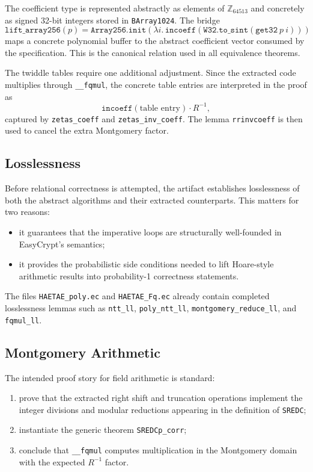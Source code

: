 \documentclass[11pt]{article}
\newcommand{\file}[1]{\texttt{#1}}
\newcommand{\ec}[1]{\texttt{#1}}
\begin{document}
The coefficient type is represented abstractly as elements of
$\mathbb{Z}_{64513}$ and concretely as signed 32-bit integers stored in
\ec{BArray1024}. The bridge
\[
\ec{lift\_array256}(p) =
\ec{Array256.init}(\lambda i.\,\ec{incoeff}(\ec{W32.to\_sint}(\ec{get32}\ p\ i)))
\]
maps a concrete polynomial buffer to the abstract coefficient vector consumed by
the specification. This is the canonical relation used in all equivalence
theorems.

The twiddle tables require one additional adjustment. Since the extracted code
multiplies through \ec{\_\_fqmul}, the concrete table entries are interpreted in
the proof as
\[
\ec{incoeff}(\text{table entry}) \cdot R^{-1},
\]
captured by \ec{zetas\_coeff} and \ec{zetas\_inv\_coeff}. The lemma
\ec{rrinvcoeff} is then used to cancel the extra Montgomery factor.

\subsection{Losslessness}

Before relational correctness is attempted, the artifact establishes
losslessness of both the abstract algorithms and their extracted counterparts.
This matters for two reasons:
\begin{itemize}[leftmargin=1.5em]
\item it guarantees that the imperative loops are structurally well-founded in
      EasyCrypt's semantics;
\item it provides the probabilistic side conditions needed to lift Hoare-style
      arithmetic results into probability-1 correctness statements.
\end{itemize}

The files \file{HAETAE\_poly.ec} and \file{HAETAE\_Fq.ec} already contain
completed losslessness lemmas such as \ec{ntt\_ll}, \ec{poly\_ntt\_ll},
\ec{montgomery\_reduce\_ll}, and \ec{fqmul\_ll}.

\subsection{Montgomery Arithmetic}

The intended proof story for field arithmetic is standard:
\begin{enumerate}[leftmargin=1.5em]
\item prove that the extracted right shift and truncation operations implement
      the integer divisions and modular reductions appearing in the definition
      of \ec{SREDC};
\item instantiate the generic theorem \ec{SREDCp\_corr};
\item conclude that \ec{\_\_fqmul} computes multiplication in the Montgomery
      domain with the expected $R^{-1}$ factor.
\end{enumerate}
\end{document}
